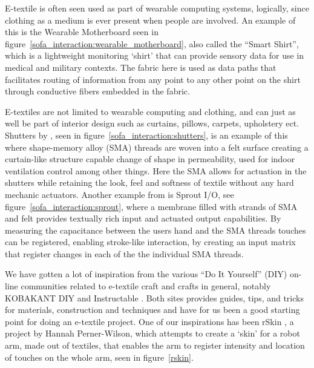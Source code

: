 E-textile is often seen used as part of wearable computing systems, logically, since clothing as a medium is ever present when people are involved.
An example of this is the Wearable Motherboard \citep{gopalsamy1999wearable} seen in figure~\ref{sofa_interaction:wearable_motherboard}, also called the ``Smart Shirt'', which is a lightweight monitoring `shirt' that can provide sensory data for use in medical and military contexts.
The fabric here is used as data paths that facilitates routing of information from any point to any other point on the shirt through conductive fibers embedded in the fabric.

E-textiles are not limited to wearable computing and clothing, and can just as well be part of interior design such as curtains, pillows, carpets, upholstery ect.
Shutters by \citet{coelho2009shutters}, seen in figure~\ref{sofa_interaction:shutters}, is an example of this where shape-memory alloy (SMA) threads are woven into a felt surface creating a curtain-like structure capable change of shape in permeability, used for indoor ventilation control among other things.
Here the SMA allows for actuation in the shutters while retaining the look, feel and softness of textile without any hard mechanic actuators.  
Another example from \citet{coelho2008sprout} is Sprout I/O, see figure~\ref{sofa_interaction:sprout}, where a membrane filled with strands of SMA and felt provides textually rich input and actuated output capabilities.
By measuring the capacitance between the users hand and the SMA threads touches can be registered, enabling stroke-like interaction, by creating an input matrix that register changes in each of the the individual SMA threads.

We have gotten a lot of inspiration from the various ``Do It Yourself'' (DIY) on-line communities related to e-textile craft and crafts in general, notably KOBAKANT DIY \citep{kobakantWEB} and Instructable \citep{instrucableWEB}.
Both sites provides guides, tips, and tricks for materials, construction and techniques and have for us been a good starting point for doing an e-textile project.
One of our inspirations has been rSkin \citep{rskinplusea,rSsininstructables}, a project by Hannah Perner-Wilson, which attempts to create a `skin' for a robot arm, made out of textiles, that enables the arm to register intensity and location of touches on the whole arm, seen in figure~\ref{rskin}.

